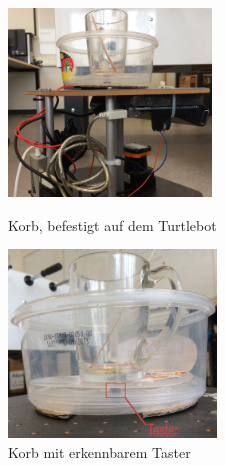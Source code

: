 \documentclass[a4paper,12pt,headsepline]{scrartcl}
\begin{document}
\begin{figure}[h]
\begin{minipage}[t]{0.45\linewidth}
\centering
\includegraphics[height=5cm]{Images/Taster01.png}
\caption{Korb, befestigt auf dem Turtlebot}
\label{fig:taster01}
\end{minipage}
\hfill
\begin{minipage}[t]{0.45\linewidth}
\centering
\includegraphics[height=5cm]{Images/Taster02.png}
\caption{Korb mit erkennbarem Taster}
\label{fig:taster02}
\end{minipage}
\end{figure}
\end{document}
